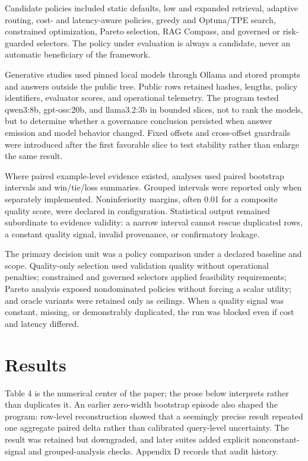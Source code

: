 \documentclass[11pt]{article}
\begin{document}
Candidate policies included static defaults, low and expanded retrieval,
adaptive routing, cost- and latency-aware policies, greedy and
Optuna/TPE search, constrained optimization, Pareto selection, RAG
Compass, and governed or risk-guarded selectors. The policy under
evaluation is always a candidate, never an automatic beneficiary of the
framework.

Generative studies used pinned local models through Ollama and stored
prompts and answers outside the public tree. Public rows retained
hashes, lengths, policy identifiers, evaluator scores, and operational
telemetry. The program tested qwen3:8b, gpt-oss:20b, and llama3.2:3b in
bounded slices, not to rank the models, but to determine whether a
governance conclusion persisted when answer emission and model behavior
changed. Fixed offsets and cross-offset guardrails were introduced after
the first favorable slice to test stability rather than enlarge the same
result.

Where paired example-level evidence existed, analyses used paired
bootstrap intervals and win/tie/loss summaries. Grouped intervals were
reported only when separately implemented. Noninferiority margins, often
0.01 for a composite quality score, were declared in configuration.
Statistical output remained subordinate to evidence validity: a narrow
interval cannot rescue duplicated rows, a constant quality signal,
invalid provenance, or confirmatory leakage.

The primary decision unit was a policy comparison under a declared
baseline and scope. Quality-only selection used validation quality
without operational penalties; constrained and governed selectors
applied feasibility requirements; Pareto analysis exposed nondominated
policies without forcing a scalar utility; and oracle variants were
retained only as ceilings. When a quality signal was constant, missing,
or demonstrably duplicated, the run was blocked even if cost and latency
differed.

\section{Results}\label{sec:results}

Table 4 is the numerical center of the paper; the prose below interprets
rather than duplicates it. An earlier zero-width bootstrap episode also
shaped the program: row-level reconstruction showed that a seemingly
precise result repeated one aggregate paired delta rather than
calibrated query-level uncertainty. The result was retained but
downgraded, and later suites added explicit nonconstant-signal and
grouped-analysis checks. Appendix D records that audit history.
\end{document}
